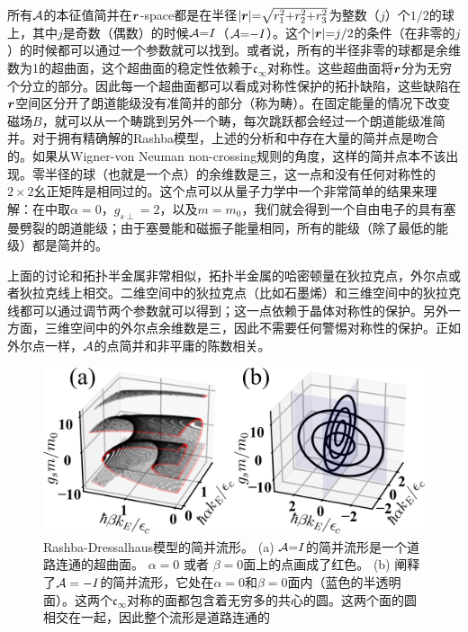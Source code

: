 所有${\cal A}$的本征值简并在$\boldsymbol{r}$-space都是在半径$|\boldsymbol{r}|{=}\sqrt{r_1^2{+}r_2^2{+}r_3^2}$为整数（$j$）个$1/2$的球上，其中${j}$是奇数（偶数）的时候${\cal A}{=}I$（${\cal A}{=}{-}I$）。这个$|\boldsymbol{r}|{=}j/2$的条件（在非零的$j$）的时候都可以通过一个参数就可以找到。或者说，所有的半径非零的球都是余维数为1的超曲面，这个超曲面的稳定性依赖于$\mathfrak{c}_{\infty}$对称性。这些超曲面将$\boldsymbol{r}$分为无穷个分立的部分。因此每一个超曲面都可以看成对称性保护的拓扑缺陷，这些缺陷在$\boldsymbol{r}$空间区分开了朗道能级没有准简并的部分（称为畴）。在固定能量的情况下改变磁场$B$，就可以从一个畴跳到另外一个畴，每次跳跃都会经过一个朗道能级准简并。对于拥有精确解的Rashba模型，上述的分析和中存在大量的简并点是吻合的。如果从Wigner-von Neuman non-crossing规则的角度\cite{neumann2000behaviour}，这样的简并点本不该出现。零半径的球（也就是一个点）的余维数是三，这一点和没有任何对称性的$2\times 2$幺正矩阵是相同过的。这个点可以从量子力学中一个非常简单的结果来理解：在中取$\alpha{=}0$，$g_{s\perp}{=}2$，以及$m{=}m_0$，我们就会得到一个自由电子的具有塞曼劈裂的朗道能级；由于塞曼能和磁振子能量相同，所有的能级（除了最低的能级）都是简并的\cite{landau2013course}。


上面的讨论和拓扑半金属非常相似，拓扑半金属的哈密顿量在狄拉克点，外尔点\cite{wang2012dirac,wan2011topological}或者狄拉克线\cite{burkov2011topological}上相交。二维空间中的狄拉克点（比如石墨烯\cite{neto2009electronic}）和三维空间中的狄拉克线都可以通过调节两个参数就可以得到；这一点依赖于晶体对称性的保护。另外一方面，三维空间中的外尔点余维数是三，因此不需要任何警惕对称性的保护。正如外尔点一样，${\cal A}$的点简并和非平庸的陈数相关\cite{TKNN}。

\begin{figure}
	\includegraphics[width=1.0\columnwidth]{../figures/dgn.png}
	\centering
	\caption{Rashba-Dressalhaus模型的简并流形。 (a) ${\cal A}{=}I$的简并流形是一个道路连通的超曲面。 $\alpha=0$ 或者 $\beta=0$面上的点画成了红色。 (b) 阐释了${\cal A}=-I$的简并流形，它处在$\alpha{=}0$和$\beta{=}0$面内（蓝色的半透明面）。这两个$\mathfrak{c}_{\infty}$对称的面都包含着无穷多的共心的圆。这两个面的圆相交在一起，因此整个流形是道路连通的 \label{fig:dgn}}
\end{figure}

